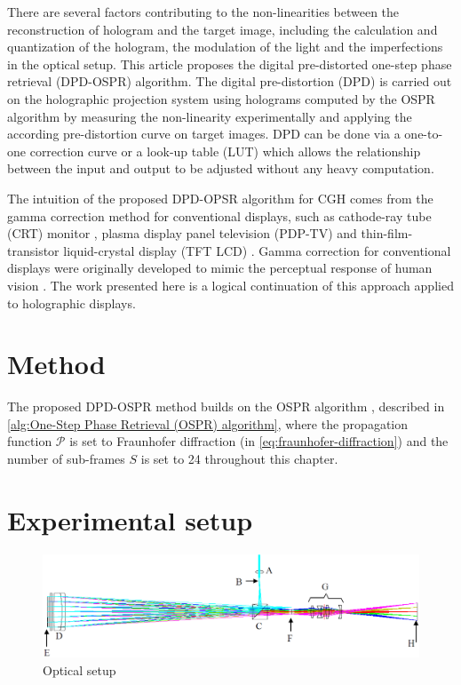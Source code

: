 There are several factors contributing to the non-linearities between the reconstruction of hologram and the target image, including the calculation and quantization of the hologram, the modulation of the light and the imperfections in the optical setup. This article proposes the digital pre-distorted one-step phase retrieval (DPD-OSPR) algorithm. The digital pre-distortion (DPD) is carried out on the holographic projection system using holograms computed by the OSPR algorithm by measuring the non-linearity experimentally and applying the according pre-distortion curve on target images. DPD can be done via a one-to-one correction curve or a look-up table (LUT) which allows the relationship between the input and output to be adjusted without any heavy computation.

The intuition of the proposed DPD-OPSR algorithm for CGH comes from the gamma correction method for conventional displays, such as cathode-ray tube (CRT) monitor \cite{Xu2009}, plasma display panel television (PDP-TV) \cite{Sung2009} and thin-film-transistor liquid-crystal display (TFT LCD) \cite{Lee2005,Prraga2014}. Gamma correction for conventional displays were originally developed to mimic the perceptual response of human vision \cite{Poynton2012}. The work presented here is a logical continuation of this approach applied to holographic displays.



\section{Method}
The proposed DPD-OSPR method builds on the OSPR algorithm \cite{Cable2004}, described in \cref{alg:One-Step Phase Retrieval (OSPR) algorithm}, where the propagation function $\mathcal{P}$ is set to Fraunhofer diffraction (in \cref{eq:fraunhofer-diffraction}) and the number of sub-frames $S$ is set to 24 throughout this chapter.

\section{Experimental setup}

\begin{figure}[H]
    \centering
    \includegraphics[width=\textwidth]{projection_setup.png}
    \caption{Optical setup \cite{Freeman2009}}
    \label{fig:projection_setup}
\end{figure}

